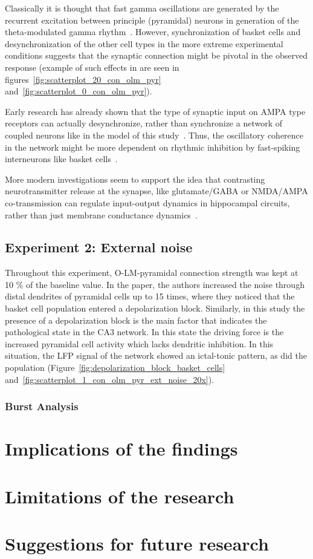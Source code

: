 Classically it is thought that fast gamma oscillations are generated by the recurrent excitation between principle (pyramidal) neurons in 
generation of the theta-modulated gamma rhythm~\parencite{wangGammaOscillationSynaptic1996}. However, synchronization of basket cells and 
desynchronization of the other cell types in the more extreme experimental conditions suggests that the synaptic connection might be pivotal 
in the observed response (example of such effects in are seen in figures~\ref{fig:scatterplot_20_con_olm_pyr} and~\ref{fig:scatterplot_0_con_olm_pyr}).

Early research has already shown that the type of synaptic input on AMPA type receptors can actually desynchronize, rather than synchronize
a network of coupled neurons like in the model of this study~\parencite{vanvreeswijkWhenInhibitionNot1994,khazipovSynchronizationGABAergicInterneuronal1997}. 
Thus, the oscillatory coherence in the network might be more dependent on rhythmic inhibition by fast-spiking interneurons 
like basket cells~\parencite{lyttonSimulationsCorticalPyramidal1991}. 

More modern investigations seem to support the idea that contrasting neurotransmitter release at the synapse, like glutamate/GABA or NMDA/AMPA co-transmission 
can regulate input-output dynamics in hippocampal circuits, rather than just membrane 
conductance dynamics~\parencite{ajibolaHypothalamicGlutamateGABA2021,micheliMechanisticModelNMDA2021}.

\subsection{Experiment 2: External noise}
Throughout this experiment, O-LM-pyramidal connection strength was kept at 10 \% of the baseline value.
In the \textcite{sanjayImpairedDendriticInhibition2015} paper, the authors increased the noise through distal dendrites of pyramidal cells up to 15 times,
where they noticed that the basket cell population entered a depolarization block. Similarly, in this study the presence of a depolarization block is the main factor
that indicates the pathological state in the CA3 network. In this state the driving force is the increased pyramidal cell activity which lacks dendritic inhibition.
In this situation, the LFP signal of the network showed an ictal-tonic pattern, as did the 
population (Figure~\ref{fig:depolarization_block_basket_cells} and~\ref{fig:scatterplot_1_con_olm_pyr_ext_noise_20x}).


\subsubsection{Burst Analysis}


\section{Implications of the findings}

\section{Limitations of the research}

\section{Suggestions for future research}